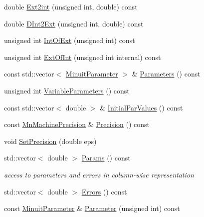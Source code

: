 \begin{DoxyCompactItemize}
\item 
double \mbox{\hyperlink{classROOT_1_1Minuit2_1_1MnUserTransformation_a0296bec1f14bc7ee514527b88aff0760}{Ext2int}} (unsigned int, double) const
\item 
double \mbox{\hyperlink{classROOT_1_1Minuit2_1_1MnUserTransformation_a35938acd16a546d398ce1c00ffc98c44}{D\+Int2\+Ext}} (unsigned int, double) const
\item 
unsigned int \mbox{\hyperlink{classROOT_1_1Minuit2_1_1MnUserTransformation_a69f58a6d486e2a57789cd8a8445cf23d}{Int\+Of\+Ext}} (unsigned int) const
\item 
unsigned int \mbox{\hyperlink{classROOT_1_1Minuit2_1_1MnUserTransformation_a114bf6d4e97b6f8bf5f3788e30e63002}{Ext\+Of\+Int}} (unsigned int internal) const
\item 
const std\+::vector$<$ \mbox{\hyperlink{classROOT_1_1Minuit2_1_1MinuitParameter}{Minuit\+Parameter}} $>$ \& \mbox{\hyperlink{classROOT_1_1Minuit2_1_1MnUserTransformation_a29366e4f3594d0cf3b5d4dc0b1597ad6}{Parameters}} () const
\item 
unsigned int \mbox{\hyperlink{classROOT_1_1Minuit2_1_1MnUserTransformation_a6e88cb38d0d19f4cf9ed3dd8102eebef}{Variable\+Parameters}} () const
\item 
const std\+::vector$<$ double $>$ \& \mbox{\hyperlink{classROOT_1_1Minuit2_1_1MnUserTransformation_a30432dec33ea27b75059a6ce28dfd5cd}{Initial\+Par\+Values}} () const
\item 
const \mbox{\hyperlink{classROOT_1_1Minuit2_1_1MnMachinePrecision}{Mn\+Machine\+Precision}} \& \mbox{\hyperlink{classROOT_1_1Minuit2_1_1MnUserTransformation_af9d893a428a4f4d94dfef1bdd3e9936e}{Precision}} () const
\item 
void \mbox{\hyperlink{classROOT_1_1Minuit2_1_1MnUserTransformation_aa80f289974f19753a2912a8eb6311f53}{Set\+Precision}} (double eps)
\item 
std\+::vector$<$ double $>$ \mbox{\hyperlink{classROOT_1_1Minuit2_1_1MnUserTransformation_a6b95cc35815242b67b6bcc2a37d5e51a}{Params}} () const
\begin{DoxyCompactList}\small\item\em access to parameters and errors in column-\/wise representation \end{DoxyCompactList}\item 
std\+::vector$<$ double $>$ \mbox{\hyperlink{classROOT_1_1Minuit2_1_1MnUserTransformation_af2da240e2a8273a63493847ab518288c}{Errors}} () const
\item 
const \mbox{\hyperlink{classROOT_1_1Minuit2_1_1MinuitParameter}{Minuit\+Parameter}} \& \mbox{\hyperlink{classROOT_1_1Minuit2_1_1MnUserTransformation_a981e9f91d85148fa2d665c7b1aae0f06}{Parameter}} (unsigned int) const

\end{DoxyCompactItemize}
